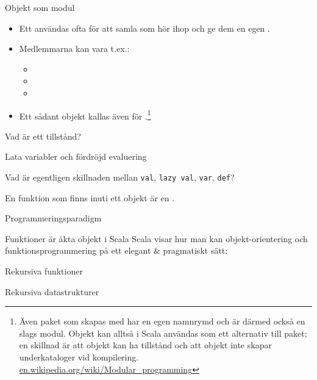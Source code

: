 \begin{Slide}{Objekt som modul}
\begin{itemize}
\item Ett  användas ofta för att samla  som hör ihop och ge dem en egen . 
\item Medlemmarna kan vara t.ex.: 
\begin{itemize}
\item  {} \item {} \item {} 
\end{itemize}
\item Ett sådant objekt kallas även för .\footnote{
Även paket som skapas med  har en egen namnrymd och är därmed också en slags modul. Objekt kan alltså i Scala användas som ett alternativ till paket; en skillnad är att objekt kan ha tillstånd och att objekt inte skapar underkataloger vid kompilering.  \href{https://en.wikipedia.org/wiki/Modular_programming}{en.wikipedia.org/wiki/Modular\_programming}}

\end{itemize}

\end{Slide}


\begin{Slide}{Vad är ett tillstånd?} 
\end{Slide} 

\begin{Slide}{Lata variabler och fördröjd evaluering} 
\end{Slide} 

\begin{Slide}{Vad är egentligen skillnaden mellan \texttt{val}, \texttt{lazy val}, \texttt{var}, \texttt{def}?} 

En funktion som finns inuti ett objekt är en .
\end{Slide} 



\begin{Slide}{Programmeringsparadigm}
\end{Slide} 


\begin{Slide}{Funktioner är äkta objekt i Scala}
Scala visar hur man kan   objekt-orientering och funktionsprogrammering på ett elegant \& pragmatiskt sätt: \\\vspace{2em}


\end{Slide} 



\begin{Slide}{Rekursiva funktioner}
\end{Slide} 

\begin{Slide}{Rekursiva datastrukturer}
\end{Slide} 

